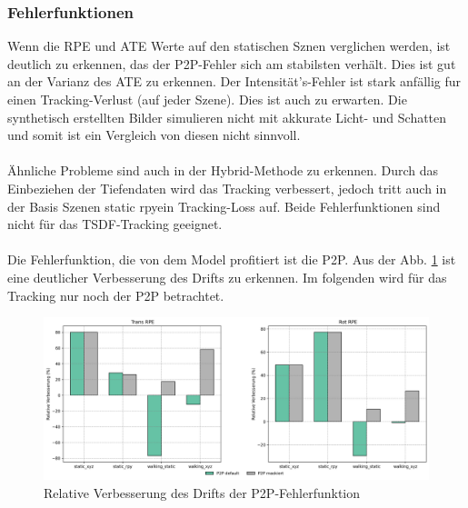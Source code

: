 \documentclass[12pt,DIV=15,BCOR=15mm,twoside,headsepline,abstract=true,listof=totoc,bibliography=totoc]{scrreprt}
\theoremstyle{remark}    %
\begin{document}
    \subsubsection{Fehlerfunktionen}
    Wenn die \ac{RPE} und \ac{ATE} Werte auf den statischen Sznen verglichen werden, ist deutlich zu erkennen, das der \ac{P2P}-Fehler sich am stabilsten verhält. 
    Dies ist gut an der Varianz des \ac{ATE} zu erkennen. Der Intensität's-Fehler ist stark anfällig fur einen Tracking-Verlust (auf jeder Szene). 
    Dies ist auch zu erwarten. Die synthetisch erstellten Bilder simulieren nicht mit akkurate Licht- und Schatten und somit ist ein Vergleich von diesen
    nicht sinnvoll.\cite{dong2023ashmodernframeworkparallel}\\\\
    Ähnliche Probleme sind auch in der Hybrid-Methode zu erkennen. Durch das Einbeziehen der Tiefendaten wird das Tracking verbessert, jedoch tritt auch in 
    der Basis Szenen \glqq static rpy\grqq ein Tracking-Loss auf. Beide Fehlerfunktionen sind nicht für das \ac{TSDF}-Tracking geeignet.\\\\
    Die Fehlerfunktion, die von dem Model profitiert ist die \ac{P2P}. Aus der Abb. \ref{fig:p2p_rel_RPE} ist eine deutlicher Verbesserung des 
    Drifts zu erkennen. Im folgenden wird für das Tracking nur noch der \ac{P2P} betrachtet.
    \begin{figure}[h]
        \centering
        \includegraphics[width=\textwidth]{pics/compose_RPE_com.png}
        \caption{Relative Verbesserung des Drifts der P2P-Fehlerfunktion}
        \label{fig:p2p_rel_RPE}
    \end{figure}
\end{document}

